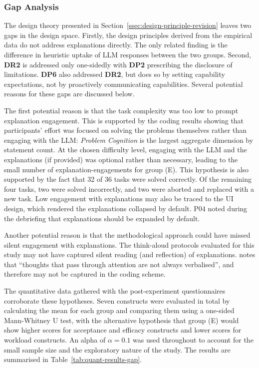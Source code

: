 \subsubsection{Gap Analysis} \label{sssec:gap-analysis}

The design theory presented in Section~\ref{ssec:design-principle-revision} leaves two gaps in the design space. Firstly, the design principles derived from the empirical data do not address explanations directly. The only related finding is the difference in heuristic uptake of \ac{LLM} responses between the two groups. Second, \textbf{DR2} is addressed only one-sidedly with \textbf{DP2} prescribing the disclosure of limitations. \textbf{DP6} also addressed \textbf{DR2}, but does so by setting capability expectations, not by proactively communicating capabilities. Several potential reasons for these gaps are discussed below.

The first potential reason is that the task complexity was too low to prompt explanation engagement. This is supported by the coding results showing that participants' effort was focused on solving the problems themselves rather than engaging with the \ac{LLM}: \textit{Problem Cognition} is the largest aggregate dimension by statement count. At the chosen difficulty level, engaging with the \ac{LLM} and the explanations (if provided) was optional rather than necessary, leading to the small number of explanation-engagements for group (E). This hypothesis is also supported by the fact that 32 of 36 tasks were solved correctly. Of the remaining four tasks, two were solved incorrectly, and two were aborted and replaced with a new task. Low engagement with explanations may also be traced to the UI design, which rendered the explanations collapsed by default. P04 noted during the debriefing that explanations should be expanded by default.

Another potential reason is that the methodological approach could have missed silent engagement with explanations. The think-aloud protocols evaluated for this study may not have captured silent reading (and reflection) of explanations. \textcite{Ericsson2017} notes that \enquote{thoughts that pass through attention are not always verbalised}, and therefore may not be captured in the coding scheme.

The quantitative data gathered with the post-experiment questionnaires corroborate these hypotheses. Seven constructs were evaluated in total by calculating the mean for each group and comparing them using a one-sided Mann-Whitney U test, with the alternative hypothesis that group (E) would show higher scores for acceptance and efficacy constructs and lower scores for workload constructs. An alpha of $\alpha=0.1$ was used throughout to account for the small sample size and the exploratory nature of the study. The results are summarised in Table~\ref{tab:quant-results-gap}.

